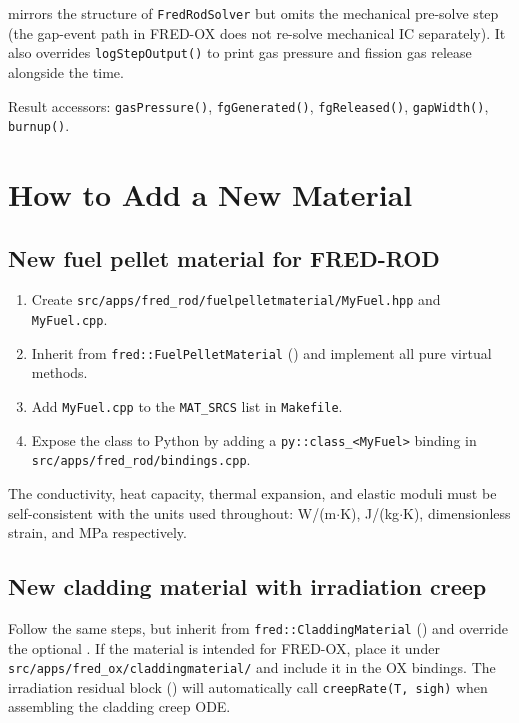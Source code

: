 \documentclass[11pt,a4paper]{article}
\begin{document}
 mirrors the structure of \texttt{FredRodSolver} but omits the mechanical pre-solve step (the gap-event path in FRED-OX does not re-solve mechanical IC separately).  It also overrides \texttt{logStepOutput()} to print gas pressure and fission gas release alongside the time.

Result accessors: \texttt{gasPressure()}, \texttt{fgGenerated()}, \texttt{fgReleased()}, \texttt{gapWidth()}, \texttt{burnup()}.

\section{How to Add a New Material}
\label{sec:new_material}

\subsection{New fuel pellet material for FRED-ROD}

\begin{enumerate}
  \item Create \texttt{src/apps/fred\_rod/fuelpelletmaterial/MyFuel.hpp} and \texttt{MyFuel.cpp}.
  \item Inherit from \texttt{fred::FuelPelletMaterial} () and implement all pure virtual methods.
  \item Add \texttt{MyFuel.cpp} to the \texttt{MAT\_SRCS} list in \texttt{Makefile}.
  \item Expose the class to Python by adding a \texttt{py::class\_<MyFuel>} binding in \texttt{src/apps/fred\_rod/bindings.cpp}.
\end{enumerate}

The conductivity, heat capacity, thermal expansion, and elastic moduli must be self-consistent with the units used throughout: W/(m$\cdot$K), J/(kg$\cdot$K), dimensionless strain, and MPa respectively.

\subsection{New cladding material with irradiation creep}

Follow the same steps, but inherit from \texttt{fred::CladdingMaterial} () and override the optional .  If the material is intended for FRED-OX, place it under \texttt{src/apps/fred\_ox/claddingmaterial/} and include it in the OX bindings.  The irradiation residual block () will automatically call \texttt{creepRate(T, sigh)} when assembling the cladding creep ODE.
\end{document}
